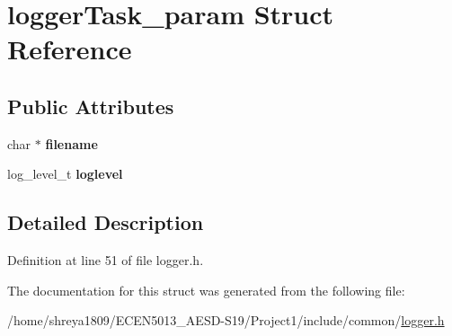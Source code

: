 \hypertarget{structloggerTask__param}{}\section{logger\+Task\+\_\+param Struct Reference}
\label{structloggerTask__param}
\subsection*{Public Attributes}
\begin{DoxyCompactItemize}
\item 
\mbox{\label{structloggerTask__param_aea04d7d9c5f62c2986470ba7e8028a89}} 
char $\ast$ {\bfseries filename}
\item 
\mbox{\label{structloggerTask__param_a00b4463ec089cbba3cfb67bfa224b777}} 
log\+\_\+level\+\_\+t {\bfseries loglevel}
\end{DoxyCompactItemize}


\subsection{Detailed Description}


Definition at line 51 of file logger.\+h.



The documentation for this struct was generated from the following file\+:\begin{DoxyCompactItemize}
\item 
/home/shreya1809/\+E\+C\+E\+N5013\+\_\+\+A\+E\+S\+D-\/\+S19/\+Project1/include/common/\hyperlink{logger_8h}{logger.\+h}\end{DoxyCompactItemize}
